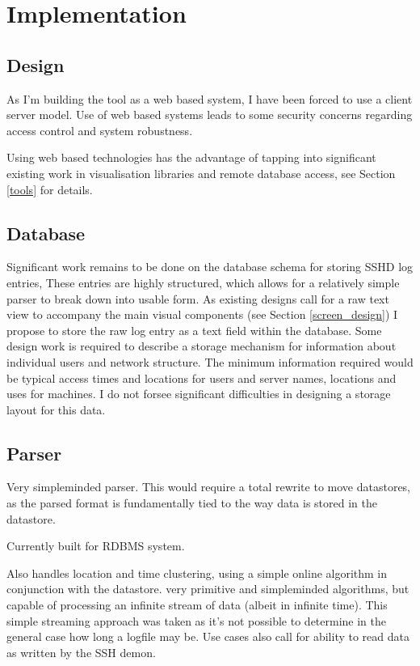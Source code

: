 \chapter{Implementation}\label{C:impl}

\section{Design}
As I'm building the tool as a web based system, I have been forced to use a client server model.
Use of web based systems leads to some security concerns regarding access control and system robustness.

Using web based technologies has the advantage of tapping into significant existing work in visualisation libraries 
and remote database access, see Section \ref{tools} for details.

\section{Database}
Significant work remains to be done on the database schema for storing SSHD log entries, These entries are highly structured, which allows for a relatively simple parser to break down into usable form. As existing designs call for a raw text view to accompany the main visual components (see Section \ref{screen_design}) I propose to store the raw log entry as a text field  within the database. Some design work is required to describe a storage mechanism for information about individual users and network structure. The minimum information required would be typical access times and locations for users and server names, locations and uses for machines. I do not forsee significant difficulties in designing a storage layout for this data.

\section{Parser}

Very simpleminded parser. This would require a total rewrite to move datastores, as the parsed format is fundamentally tied to the way data is stored in the datastore. 

Currently built for RDBMS system.

Also handles location and time clustering, using a simple online algorithm in conjunction with the datastore. very primitive and simpleminded algorithms, but capable of processing an infinite stream of data (albeit in infinite time). This simple streaming approach was taken as it's not possible to determine in the general case how long a logfile may be. Use cases also call for ability to read data as written by the SSH demon. 

